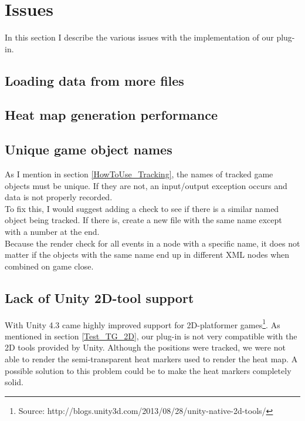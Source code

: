 \section{Issues}
\label{Issues}
In this section I describe the various issues with the implementation of our plug-in.
\subsection{Loading data from more files}
\label{Issues_MoreFiles}

\subsection{Heat map generation performance}
\label{Issues_generationPerformance}

\subsection{Unique game object names}
\label{Issues_UniqueNames}
As I mention in section \ref{HowToUse_Tracking}, the names of tracked game objects must be unique. If they are not, an input/output exception occurs and data is not properly recorded. 
\\To fix this, I would suggest adding a check to see if there is a similar named object being tracked. If there is, create a new file with the same name except with a number at the end. 
\\Because the render check for all events in a node with a specific name, it does not matter if the objects with the same name end up in different XML nodes when combined on game close.

\subsection{Lack of Unity 2D-tool support}
\label{Issues_2DSupport}
With Unity 4.3 came highly improved support for 2D-platformer games\footnote{Source: http://blogs.unity3d.com/2013/08/28/unity-native-2d-tools/}. As mentioned in section \ref{Test_TG_2D}, our plug-in is not very compatible with the 2D tools provided by Unity. Although the positions were tracked, we were not able to render the semi-transparent heat markers used to render the heat map. A possible solution to this problem could be to make the heat markers completely solid.